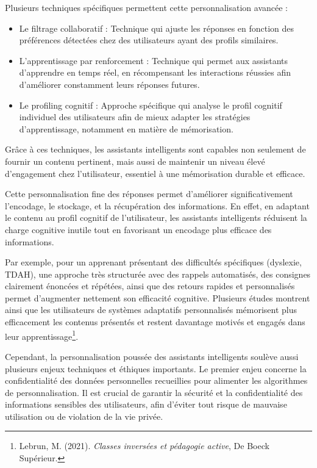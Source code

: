 \documentclass[12pt,a4paper]{report}
\begin{document}
Plusieurs techniques spécifiques permettent cette personnalisation avancée :
\begin{itemize}

    \item Le filtrage collaboratif : Technique qui ajuste les réponses en fonction des préférences détectées chez des utilisateurs ayant des profils similaires.
    
    \item L’apprentissage par renforcement : Technique qui permet aux assistants d’apprendre en temps réel, en récompensant les interactions réussies afin d'améliorer constamment leurs réponses futures.
    
    \item Le profiling cognitif : Approche spécifique qui analyse le profil cognitif individuel des utilisateurs afin de mieux adapter les stratégies d’apprentissage, notamment en matière de mémorisation.
    
\end{itemize}

Grâce à ces techniques, les assistants intelligents sont capables non seulement de fournir un contenu pertinent, mais aussi de maintenir un niveau élevé d’engagement chez l’utilisateur, essentiel à une mémorisation durable et efficace.

Cette personnalisation fine des réponses permet d'améliorer significativement l’encodage, le stockage, et la récupération des informations. En effet, en adaptant le contenu au profil cognitif de l'utilisateur, les assistants intelligents réduisent la charge cognitive inutile tout en favorisant un encodage plus efficace des informations.

Par exemple, pour un apprenant présentant des difficultés spécifiques (dyslexie, TDAH), une approche très structurée avec des rappels automatisés, des consignes clairement énoncées et répétées, ainsi que des retours rapides et personnalisés permet d'augmenter nettement son efficacité cognitive. Plusieurs études montrent ainsi que les utilisateurs de systèmes adaptatifs personnalisés mémorisent plus efficacement les contenus présentés et restent davantage motivés et engagés dans leur apprentissage\footnote{Lebrun, M. (2021). \textit{Classes inversées et pédagogie active}, De Boeck Supérieur.}.

Cependant, la personnalisation poussée des assistants intelligents soulève aussi plusieurs enjeux techniques et éthiques importants. Le premier enjeu concerne la confidentialité des données personnelles recueillies pour alimenter les algorithmes de personnalisation. Il est crucial de garantir la sécurité et la confidentialité des informations sensibles des utilisateurs, afin d'éviter tout risque de mauvaise utilisation ou de violation de la vie privée.
\end{document}
